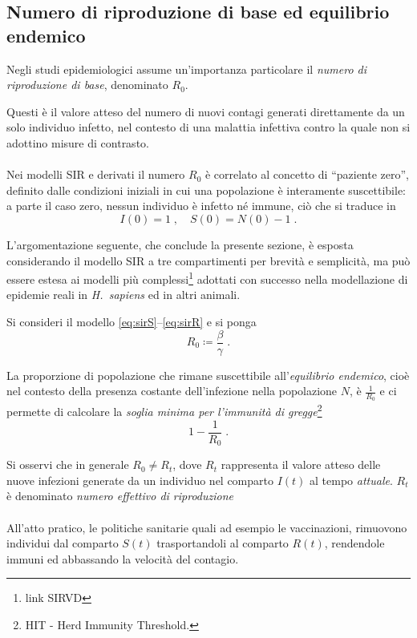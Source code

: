 \subsection{Numero di riproduzione di base ed equilibrio endemico}
Negli studi epidemiologici assume un'importanza particolare il \emph{numero di riproduzione di base}, denominato $R_0$.

Questi è il valore atteso del numero di nuovi contagi generati direttamente da un solo individuo infetto, nel contesto
di una malattia infettiva contro la quale non si adottino misure di contrasto.

\paragraph{}
Nei modelli SIR e derivati il numero $R_0$ è correlato al concetto di ``paziente zero'', definito dalle condizioni
iniziali in cui una popolazione è interamente suscettibile: a parte il caso zero, nessun individuo è infetto né immune,
ciò che si traduce in
$$I(0) = 1 \;, \quad S(0) = N(0) - 1 \; .$$

L'argomentazione seguente, che conclude la presente sezione, è esposta considerando il modello SIR a tre compartimenti
per brevità e semplicità, ma può essere estesa ai modelli più complessi\footnote{link SIRVD}
adottati con successo nella modellazione di epidemie reali in \emph{H.~sapiens} ed in altri animali.

Si consideri il modello \eqref{eq:sirS}--\eqref{eq:sirR} e si ponga
\begin{equation}
    R_0 \coloneq \frac{\beta}{\gamma} \; .
    \label{eq:rzero}
\end{equation}

La proporzione di popolazione che rimane suscettibile all'\emph{equilibrio endemico}, cioè nel contesto della presenza
costante dell'infezione nella popolazione $N$, è $\frac{1}{R_0}$ e ci permette di calcolare la
\emph{soglia minima per l'immunità di gregge}\footnote{HIT - Herd Immunity Threshold.}
$$1 - \frac{1}{R_0} \; .$$

Si osservi che in generale $R_0 \neq R_t$, dove $R_t$ rappresenta il valore atteso delle nuove infezioni generate da
un individuo nel comparto $I(t)$ al tempo \emph{attuale}. $R_t$ è denominato \emph{numero effettivo di riproduzione}

\paragraph{}
All'atto pratico, le politiche sanitarie quali ad esempio le vaccinazioni, rimuovono individui dal comparto $S(t)$
trasportandoli al comparto $R(t)$, rendendole immuni ed abbassando la velocità del contagio.

